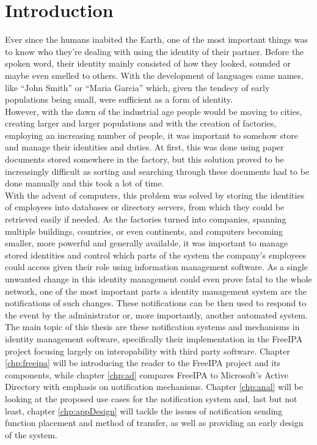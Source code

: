 
\chapter{Introduction}

Ever since the humans inabited the Earth, one of the most important things was to know who they're dealing with using the identity of their partner. Before the spoken word, their identity mainly consisted of how they looked, sounded or maybe even smelled to others.
With the development of languages came names, like ``John Smith'' or ``Maria Garcia'' which, given the tendecy of early populations being small, were sufficient as a form of identity. \\
However, with the dawn of the industrial age people would be moving to cities, creating larger and larger populations and with the creation of factories, employing an increasing number of people, it was important to somehow store and manage
their identities and duties. At first, this was done using paper documents stored somewhere in the factory, but this solution proved to be increasingly difficult as sorting and searching through these documents had to be done manually and this took a lot of time. \\
With the advent of computers, this problem was solved by storing the identities of employees into databases or directory servers, from which they could be retrieved easily if needed.
As the factories turned into companies, spanning multiple buildings, countries, or even continents, and computers becoming smaller, more powerful and generally available, it was important to manage stored identities
and control which parts of the system the company's employees could access given their role using information management software. As a single unwanted change in this identity management could even prove fatal to the whole network, one of the most important parts a identity management system are the notifications of such changes.
These notifications can be then used to respond to the event by the administrator or, more importantly, another automated system.\\
The main topic of this thesis are these notification systems and mechanisms in identity management software, specifically their implementation in the FreeIPA project focusing largely on interopability with third party software.
Chapter \ref{chp:freeipa} will be introducing the reader to the FreeIPA project and its components, while chapter \ref{chp:ad} compares FreeIPA to Microsoft's Active Directory with emphasis on notification mechanisms.
Chapter \ref{chp:anal} will be looking at the proposed use cases for the notification system and, last but not least, chapter \ref{chp:appDesign} will tackle the issues of notification sending function placement and method of transfer, as well as providing an early design of the system.

